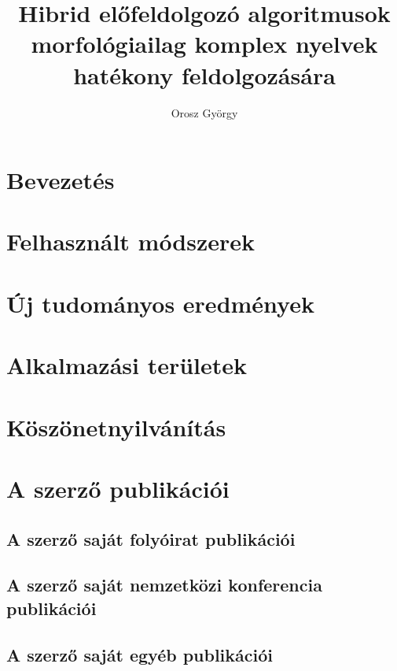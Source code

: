 \documentclass[twoside]{article}
\author{Orosz György}
\title{Hibrid előfeldolgozó algoritmusok morfológiailag komplex nyelvek hatékony feldolgozására}
\theoremstyle{thesis}
\theoremstyle{pub}
\theoremstyle{app}
\theoremstyle{thesis}
\begin{document}
\maketitle

\section{Bevezetés}
% 
% 
\section{Felhasznált módszerek}
% 

\pagebreak
\section{Új tudományos eredmények}


\section{Alkalmazási területek}


\section{Köszönetnyilvánítás}
% 
\section{A szerző publikációi}

\subsection*{A szerző saját folyóirat publikációi}

\subsection*{A szerző saját nemzetközi konferencia publikációi}

\subsection*{A szerző saját egyéb publikációi}





\nocite{*}
\cleardoublepage
 
\end{document}
